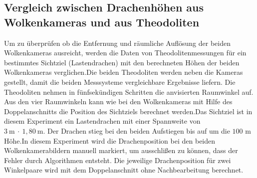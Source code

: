 \documentclass[a4paper,11pt,twoside,german]{article}
\newcommand{\absatz}{\smallbreak}
\begin{document}
\subsection{Vergleich zwischen Drachenhöhen aus Wolkenkameras und aus Theodoliten}
\label{SECDragon}

Um zu überprüfen ob die Entfernung und räumliche Auflösung der beiden
Wolkenkameras ausreicht, werden die Daten von Theodolitenmessungen für ein
bestimmtes Sichtziel (Lastendrachen) mit den berechneten Höhen der beiden
Wolkenkameras verglichen.\absatz Die beiden Theodoliten werden neben die Kameras
gestellt, damit die beiden Messsysteme vergleichbare Ergebnisse liefern. Die
Theodoliten nehmen in fünfsekündigen Schritten die anvisierten Raumwinkel auf.
Aus den vier Raumwinkeln kann wie bei den Wolkenkameras mit Hilfe des
Doppelanschnitts die Position des Sichtziels berechnet werden.\absatz Das
Sichtziel ist in diesem Experiment ein Lastendrachen mit einer Spannweite
von\\$3~\text{m}~\cdot~1,80~\text{m}$. Der Drachen stieg bei den beiden
Aufstiegen bis auf um die $100$ m Höhe.\absatz In diesem Experiment wird die
Drachenposition bei den beiden Wolkenkamerabildern manuell markiert, um
ausschlißen zu können, dass der Fehler durch Algorithmen entsteht. Die jeweilige
Drachenposition für zwei Winkelpaare wird mit dem Doppelanschnitt ohne
Nachbearbeitung berechnet.\absatz
\end{document}
